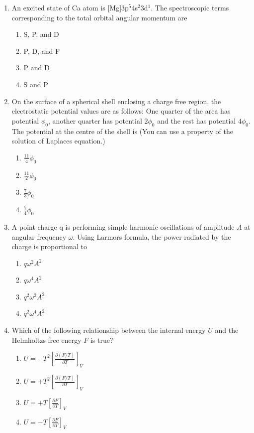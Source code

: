 \documentclass[journal,12pt,onecolumn]{IEEEtran}
\theoremstyle{remark}
\begin{document}
\begin{enumerate}
\item
An excited state of Ca atom is [Mg]3p$^5$4s$^2$3d$^1$. The spectroscopic terms corresponding to the total orbital angular momentum are
\begin{enumerate}
    \item S, P, and D
    \item P, D, and F
    \item P and D
    \item S and P
\end{enumerate}


\item
On the surface of a spherical shell enclosing a charge free region, the electrostatic potential values are as follows: One quarter of the area has potential $\phi_0$, another quarter has potential $2\phi_0$ and the rest has potential $4\phi_0$. The potential at the centre of the shell is (You can use a property of the solution of Laplace\textquotesingle s equation.)
\begin{enumerate}
    \item $\frac{11}{4}\phi_0$
    \item $\frac{11}{2}\phi_0$
    \item $\frac{7}{3}\phi_0$
    \item $\frac{7}{4}\phi_0$
\end{enumerate}


\item
A point charge q is performing simple harmonic oscillations of amplitude $A$ at angular frequency $\omega$. Using Larmor\textquotesingle s formula, the power radiated by the charge is proportional to
\begin{enumerate}
    \item $q \omega^2 A^2$
    \item $q \omega^4 A^2$
    \item $q^2 \omega^2 A^2$
    \item $q^2 \omega^4 A^2$
\end{enumerate}


\item
Which of the following relationship between the internal energy $U$ and the Helmholtz\textquotesingle s free energy $F$ is true?
\begin{enumerate}
    \item $U = -T^2 \left[ \frac{\partial (F/T)}{\partial T} \right]_V$
    \item $U = +T^2 \left[ \frac{\partial (F/T)}{\partial T} \right]_V$
    \item $U = +T \left[ \frac{\partial F}{\partial T} \right]_V$
    \item $U = -T \left[ \frac{\partial F}{\partial T} \right]_V$
\end{enumerate}



\end{enumerate}
\end{document}
